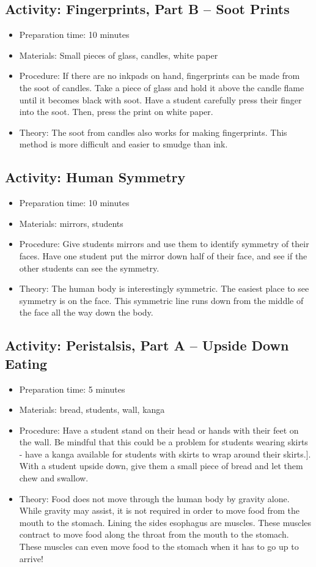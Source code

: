 \subsection{Activity: Fingerprints, Part B – Soot Prints}
\begin{itemize}
\item{Preparation time: 10 minutes}
\item{Materials: Small pieces of glass, candles, white paper}
\item{Procedure: If there are no inkpads on hand, fingerprints can be made from the soot of candles. Take a piece of glass and hold it above the candle flame until it becomes black with soot. Have a student carefully press their finger into the soot. Then, press the print on white paper.}
\item{Theory: The soot from candles also works for making fingerprints. This method is more difficult and easier to smudge than ink.}
\end{itemize}

\subsection{Activity: Human Symmetry}
\begin{itemize}
\item{Preparation time: 10 minutes}
\item{Materials: mirrors, students}
\item{Procedure: Give students mirrors and use them to identify symmetry of their faces. Have one student put the mirror down half of their face, and see if the other students can see the symmetry.}
\item{Theory: The human body is interestingly symmetric. The easiest place to see symmetry is on the face. This symmetric line runs down from the middle of the face all the way down the body.}
\end{itemize}

\subsection{Activity: Peristalsis, Part A – Upside Down Eating}
\begin{itemize}
\item{Preparation time: 5 minutes}
\item{Materials: bread, students, wall, kanga}
\item{Procedure: Have a student stand on their head or hands with their feet on the wall. Be mindful that this could be a problem for students wearing skirts - have a kanga available for students with skirts to wrap around their skirts.]. With a student upside down, give them a small piece of bread and let them chew and swallow.}
\item{Theory: Food does not move through the human body by gravity alone. While gravity may assist, it is not required in order to move food from the mouth to the stomach. Lining the sides esophagus are muscles. These muscles contract to move food along the throat from the mouth to the stomach. These muscles can even move food to the stomach when it has to go up to arrive!}
\end{itemize}

